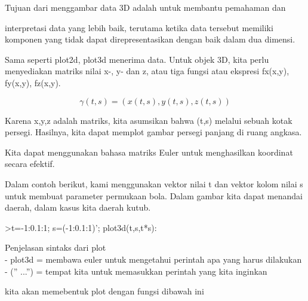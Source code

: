 \documentclass[a4paper,10pt]{article}
\begin{document}
\begin{eulernotebook}
\begin{eulercomment}
\begin{eulercomment}
\begin{eulercomment}
\begin{eulercomment}
\begin{eulercomment}
\begin{eulercomment}
\begin{eulercomment}
\begin{eulercomment}
\begin{eulercomment}
\begin{eulercomment}
\begin{eulercomment}
\begin{eulercomment}
\begin{eulercomment}
\end{eulercomment}
\begin{eulerttcomment}
  Tujuan dari menggambar data 3D adalah untuk membantu pemahaman dan
\end{eulerttcomment}
\begin{eulercomment}
interpretasi data yang lebih baik, terutama ketika data tersebut
memiliki komponen yang tidak dapat direpresentasikan dengan baik dalam
dua dimensi.

Sama seperti plot2d, plot3d menerima data. Untuk objek 3D, kita perlu
menyediakan matriks nilai x-, y- dan z, atau tiga fungsi atau ekspresi
fx(x,y), fy(x,y), fz(x,y).

\end{eulercomment}
\begin{eulerformula}
\[
\gamma(t,s) = (x(t,s),y(t,s),z(t,s))
\]
\end{eulerformula}
\begin{eulercomment}
Karena x,y,z adalah matriks, kita asumsikan bahwa (t,s) melalui sebuah
kotak persegi. Hasilnya, kita dapat memplot gambar persegi panjang di
ruang angkasa.

Kita dapat menggunakan bahasa matriks Euler untuk menghasilkan
koordinat secara efektif.

Dalam contoh berikut, kami menggunakan vektor nilai t dan vektor kolom
nilai s untuk membuat parameter permukaan bola. Dalam gambar kita
dapat menandai daerah, dalam kasus kita daerah kutub.

\end{eulercomment}
\begin{eulerprompt}
>t=-1:0.1:1; s=(-1:0.1:1)'; plot3d(t,s,t*s):
\end{eulerprompt}
\begin{eulercomment}
Penjelasan sintaks dari plot\\
- plot3d = membawa euler untuk mengetahui perintah apa yang harus
dilakukan\\
- (” ...”) = tempat kita untuk memasukkan perintah yang kita inginkan

\end{eulercomment}
\begin{eulercomment}
kita akan memebentuk plot dengan fungsi dibawah ini


\end{eulercomment}
\end{eulercomment}
\end{eulercomment}
\end{eulercomment}
\end{eulercomment}
\end{eulercomment}
\end{eulercomment}
\end{eulercomment}
\end{eulercomment}
\end{eulercomment}
\end{eulercomment}
\end{eulercomment}
\end{eulercomment}
\end{eulernotebook}
\end{document}
